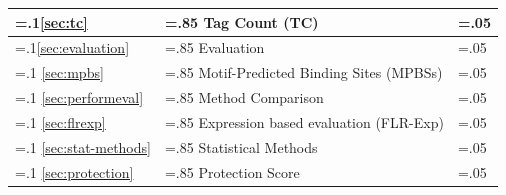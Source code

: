 \documentclass[11pt]{article}
\begin{document}
\begin{table}[h!]
\begin{center}
\begin{tabularx}{\textwidth}{ |>{\hsize=.1\hsize}X|>{\hsize=.85\hsize}X|>{\hsize=.05\hsize}X| }
\hline
\ref{sec:tc} & Tag Count (TC)  & \pageref{sec:tc} \\
\hline
\ref{sec:evaluation} & Evaluation  & \pageref{sec:evaluation} \\
\hline
\ref{sec:mpbs} & Motif-Predicted Binding Sites (MPBSs)  & \pageref{sec:mpbs} \\
\hline
\ref{sec:performeval} & Method Comparison  & \pageref{sec:performeval} \\
\hline
\ref{sec:flrexp} & Expression based evaluation (FLR-Exp) & \pageref{sec:flrexp} \\
\hline
\ref{sec:stat-methods} & Statistical Methods  & \pageref{sec:stat-methods} \\
\hline
\ref{sec:protection} & Protection Score  & \pageref{sec:protection} \\
\hline
\end{tabularx}
\end{center}
\end{table}

\clearpage
\end{document}
